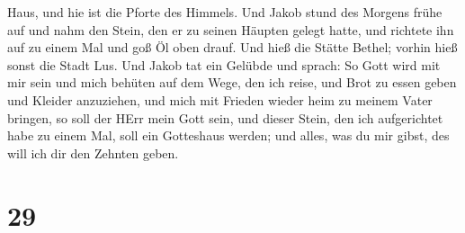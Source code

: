 Haus, und hie ist die Pforte des Himmels.  Und Jakob stund
des Morgens frühe auf und nahm den Stein, den er zu seinen Häupten
gelegt hatte, und richtete ihn auf zu einem Mal und goß Öl oben drauf.
 Und hieß die Stätte Bethel; vorhin hieß sonst die Stadt
Lus.  Und Jakob tat ein Gelübde und sprach: So Gott wird
mit mir sein und mich behüten auf dem Wege, den ich reise, und Brot zu
essen geben und Kleider anzuziehen,  und mich mit Frieden
wieder heim zu meinem Vater bringen, so soll der HErr mein Gott sein,
 und dieser Stein, den ich aufgerichtet habe zu einem Mal,
soll ein Gotteshaus werden; und alles, was du mir gibst, des will ich
dir den Zehnten geben.

\hypertarget{section-28}{%
\section{29}\label{section-28}}

